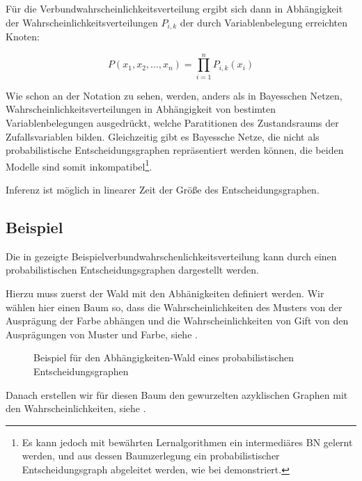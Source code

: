 \documentclass{llncs}
\begin{document}
Für die Verbundwahrscheinlichkeitsverteilung ergibt sich dann in Abhängigkeit der Wahrscheinlichkeitsverteilungen $P_{i,k}$ der durch Variablenbelegung erreichten Knoten: 

\[P(x_1,x_2,\dots,x_n) = \prod_{i=1}^n P_{i,k}(x_i) \]

Wie schon an der Notation zu sehen, werden, anders als in Bayesschen Netzen, Wahrscheinlichkeitsverteilungen in Abhängigkeit von bestimten Variablenbelegungen ausgedrückt, welche Paratitionen des Zustandsraums der Zufallsvariablen bilden. Gleichzeitig gibt es Bayessche Netze, die nicht als probabilistische Entscheidungsgraphen repräsentiert werden können, die beiden Modelle sind somit inkompatibel\footnote{Es kann jedoch mit bewährten Lernalgorithmen ein intermediäres BN gelernt werden, und aus dessen Baumzerlegung ein probabilistischer Entscheidungsgraph abgeleitet werden, wie bei \cite{jaeger2006learning} demonstriert. }. 

Inferenz ist möglich in linearer Zeit der Größe des Entscheidungsgraphen. 

\subsection{Beispiel}

Die in  gezeigte Beispielverbundwahrschenlichkeitsverteilung kann durch einen probabilistischen Entscheidungsgraphen dargestellt werden. 

Hierzu muss zuerst der Wald mit den Abhänigkeiten definiert werden. Wir wählen hier einen Baum so, dass die Wahrscheinlichkeiten des Musters von der Ausprägung der Farbe abhängen und die Wahrscheinlichkeiten von Gift von den Ausprägungen von Muster und Farbe, siehe . 

\begin{figure}[htb]
\caption{\label{fig:pdgforest}Beispiel für den Abhängigkeiten-Wald eines probabilistischen Entscheidungsgraphen}
\centering
{}
\end{figure}

Danach erstellen wir für diesen Baum den gewurzelten azyklischen Graphen mit den Wahrscheinlichkeiten, siehe .
\end{document}
